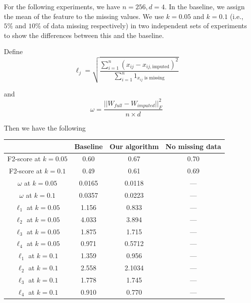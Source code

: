 \documentclass[a4paper]{article}
\begin{document}
For the following experiments, we have $n = 256, d = 4$. In the baseline, we assign the mean of the feature to the missing values. We use $k = 0.05$ and $k = 0.1$ (i.e., $5\%$ and $10\%$ of data
missing respectively) in two independent sets of experiments to show the differences between this and the baseline.

Define $$\ell_j = \sqrt{\frac{\sum_{i = 1}^n (x_{ij} - x_{ij, \text{imputed}})^2}{\sum_{i = 1}^n 1_{x_{ij}\text{ is missing}}}}$$

and
$$
\omega = \frac{||W_{full} - W_{imputed}||_F^2}{n \times d}
$$

Then we have the following

\begin{center}
\begin{tabular}{|c|c|c|c|}
    \hline
                                & Baseline  & Our algorithm     & No missing data \\
    \hline
    F2-score at $k = 0.05$      & 0.60      & 0.67              & 0.70 \\
    \hline
    F2-score at $k = 0.1$       & 0.49      & 0.61              & 0.69 \\
    \hline
    $\omega$ at $k = 0.05$      & 0.0165    &    0.0118         & ---\\
    \hline
    $\omega$ at $k = 0.1$       & 0.0357    &    0.0223         & ---\\
    \hline
    $\ell_1$ at $k = 0.05$      & 1.156     &    0.833          & ---\\
    \hline
    $\ell_2$ at $k = 0.05$      & 4.033     &      3.894          & ---\\
    \hline
    $\ell_3$ at $k = 0.05$      & 1.875     &      1.715        & ---\\
    \hline
    $\ell_4$ at $k = 0.05$      & 0.971     &      0.5712        & ---\\
    \hline
    $\ell_1$ at $k = 0.1$       & 1.359     &    0.956         & ---\\
    \hline
    $\ell_2$ at $k = 0.1$       & 2.558     &   2.1034           & ---\\
    \hline
    $\ell_3$ at $k = 0.1$       & 1.778     &    1.745         & ---\\
    \hline
    $\ell_4$ at $k = 0.1$       & 0.910     &    0.770          & ---\\
    \hline

\end{tabular}
\end{center}
\end{document}
